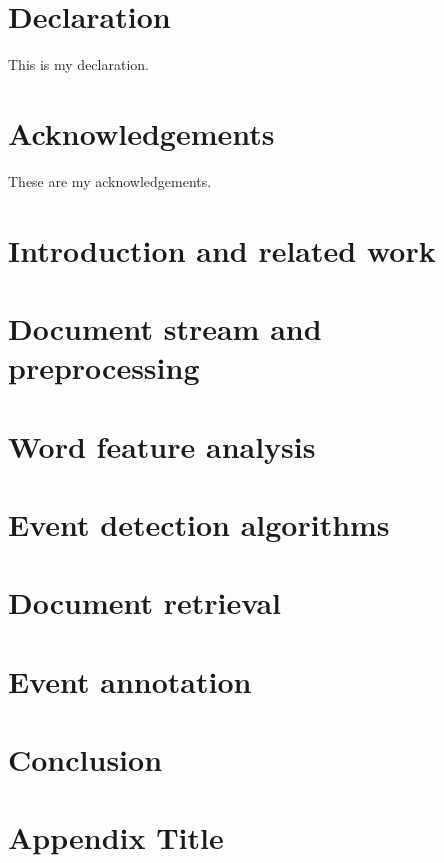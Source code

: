 \documentclass[12pt,twoside]{report}
\begin{document}






\chapter*{Declaration}
This is my declaration.


\chapter*{Acknowledgements}
These are my acknowledgements.


\tableofcontents
\listoffigures
\listofalgorithms


\chapter{Introduction and related work}


\chapter{Document stream and preprocessing}
\label{chap:data-preprocessing}


\chapter{Word feature analysis}
\label{chap:word-analysis}


\chapter{Event detection algorithms}
\label{chap:event-detection}


\chapter{Document retrieval}
\label{chap:document-retrieval}


\chapter{Event annotation}


\chapter{Conclusion}



\appendix
\chapter{Appendix Title}



\printbibliography
\end{document}
